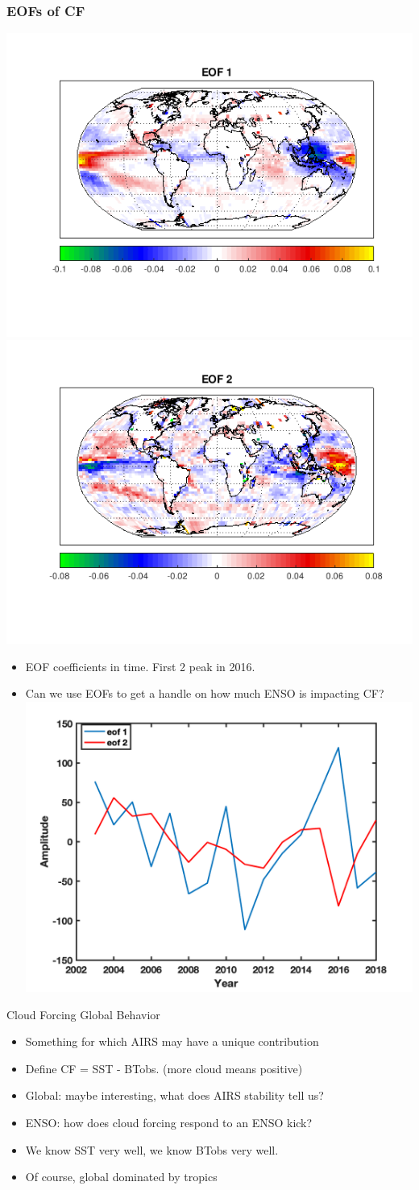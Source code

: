 \documentclass[10pt,t]{beamer}
\begin{document}
 \begin{frame}
  \frametitle{EOFs of CF}
   \centering
   \includegraphics[width=0.4\linewidth]{./figures/eof_1.png}
   \includegraphics[width=0.4\linewidth]{./figures/eof_2.png} \\  
\begin{itemize} 
  \item EOF coefficients in time. First 2 peak in 2016. 
  \item Can we use EOFs to get a handle on how much ENSO is impacting CF? 
   \includegraphics[width=0.4\linewidth]{./figures/eofs_1_2.png}  
\end{itemize} 
 \end{frame}

\begin{frame}[label={sec:org273b7f2}]{Cloud Forcing Global Behavior}
\begin{itemize}
\item Something for which AIRS may have a unique contribution
\item Define CF = SST - BTobs.  (more cloud means positive)
\item Global: maybe interesting, what does AIRS stability tell us?
\item ENSO:  how does cloud forcing respond to an ENSO kick?
\item We know SST very well, we know BTobs very well.
\item Of course, global dominated by tropics
\end{itemize}
\end{frame}
\end{document}
